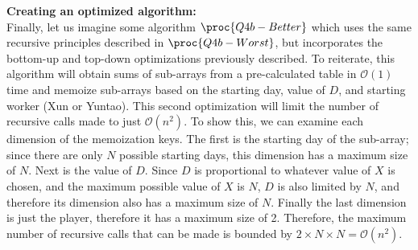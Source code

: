 
\textbf{Creating an optimized algorithm: }\\
Finally, let us imagine some algorithm $\proc{Q4b-Better}$ which uses the same recursive principles described in $\proc{Q4b-Worst}$, but incorporates the bottom-up and top-down optimizations previously described.
To reiterate, this algorithm will obtain sums of sub-arrays from a pre-calculated table in $\mathcal{O}(1)$ time and memoize sub-arrays based on the starting day, value of $D$, and starting worker (Xun or Yuntao).
This second optimization will limit the number of recursive calls made to just $\mathcal{O}(n^2)$.
To show this, we can examine each dimension of the memoization keys.
The first is the starting day of the sub-array; since there are only $N$ possible starting days, this dimension has a maximum size of $N$.
Next is the value of $D$.
Since $D$ is proportional to whatever value of $X$ is chosen, and the maximum possible value of $X$ is $N$, $D$ is also limited by $N$, and therefore its dimension also has a maximum size of $N$.
Finally the last dimension is just the player, therefore it has a maximum size of 2.
Therefore, the maximum number of recursive calls that can be made is bounded by $2 \times N \times N = \mathcal{O}(n^2)$. \\

